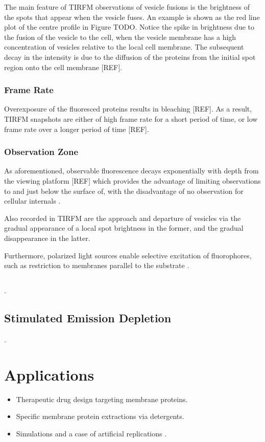 \documentclass{report}
\begin{document}
The main feature of TIRFM observations of vesicle fusions is the brightness of the spots that appear when the vesicle fuses. An example is shown as the red line plot of the centre profile in Figure TODO. Notice the spike in brightness due to the fusion of the vesicle to the cell, when the vesicle membrane has a high concentration of vesicles relative to the local cell membrane. The subsequent decay in the intensity is due to the diffusion of the proteins from the initial spot region onto the cell membrane [REF].

\subsubsection{Frame Rate}
Overexposure of the fluoresced proteins results in bleaching [REF]. As a result, TIRFM snapshots are either of high frame rate for a short period of time, or low frame rate over a longer period of time [REF].

\subsubsection{Observation Zone}
As aforementioned, observable fluorescence decays exponentially with depth from the viewing platform [REF] which provides the advantage of limiting observations to and just below the surface of, with the disadvantage of no observation for cellular internals \cite{axelrod2001total}.

Also recorded in TIRFM are the approach and departure of vesicles via the gradual appearance of a local spot brightness in the former, and the gradual disappearance in the latter.

Furthermore, polarized light sources enable selective excitation of fluorophores, such as restriction to membranes parallel to the substrate \cite{axelrod1989total}.

\subsection{}
\cite{he2006two}.

\subsection{Stimulated Emission Depletion}
\cite{willig2006sted}.

\section{Applications}
\begin{itemize}
	\item Therapeutic drug design targeting membrane proteins.
	\item Specific membrane protein extractions via detergents.
	\item Simulations \cite{marrink2019computational} and a case of artificial replications \cite{de2006controlled}.
\end{itemize}
\end{document}
